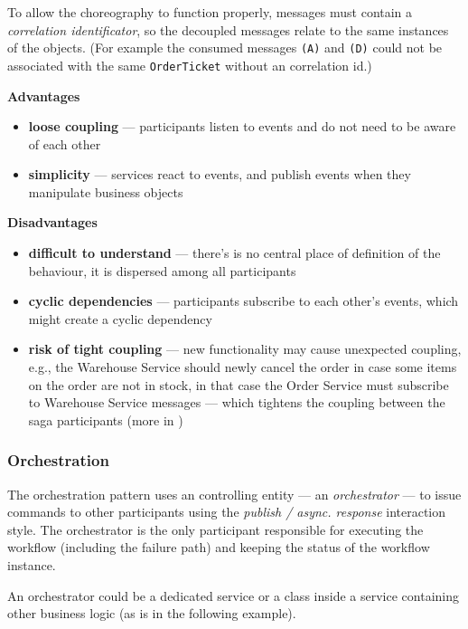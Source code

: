 \documentclass[thesis=M,english,hidelinks]{FITthesis}[2012/10/20]
\begin{document}
To allow the choreography to function properly, messages must contain a \textit{correlation identificator}, so the decoupled messages relate to the same instances of the objects. (For example the consumed messages \texttt{(A)} and \texttt{(D)} could not be associated with the same \texttt{OrderTicket} without an correlation id.)

\vspace{1em}
\noindent
\textbf{Advantages}
\begin{itemize}
    \item \textbf{loose coupling} --- participants listen to events and do not need to be aware of each other
    \item \textbf{simplicity} --- services react to events, and publish events when they manipulate business objects
\end{itemize}

\noindent
\textbf{Disadvantages}
\begin{itemize}
    \item \textbf{difficult to understand} --- there's is no central place of definition of the behaviour, it is dispersed among all participants
    \item \textbf{cyclic dependencies} --- participants subscribe to each other’s events, which might create a cyclic dependency
    \item \textbf{risk of tight coupling} --- new functionality may cause unexpected coupling, e.g., the Warehouse Service should newly cancel the order in case some items on the order are not in stock, in that case the Order Service must subscribe to Warehouse Service messages --- which tightens the coupling between the saga participants (more in \cite{ms-com-event-chor-coupling})
\end{itemize}

\subsubsection{Orchestration}
The orchestration pattern uses an controlling entity --- an \textit{orchestrator} --- to issue commands to other participants using the \textit{publish / async. response} interaction style. The orchestrator is the only participant responsible for executing the workflow (including the failure path) and keeping the status of the workflow instance.

An orchestrator could be a dedicated service or a class inside a service containing other business logic (as is in the following example).
\end{document}
